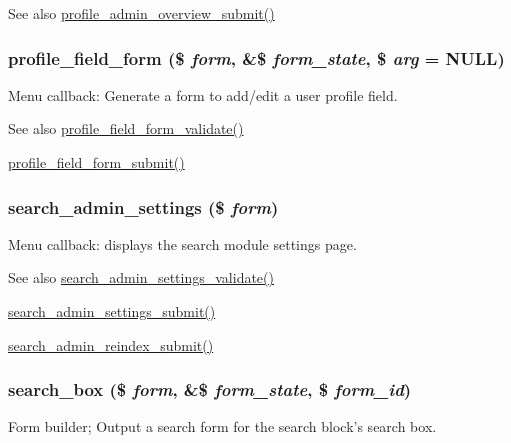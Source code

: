 \begin{DoxySeeAlso}{See also}
\hyperlink{profile_8admin_8inc_a010af3295f669ceac61a1da0f8d5ad53}{profile\_\-admin\_\-overview\_\-submit()} 
\end{DoxySeeAlso}
\hypertarget{group__forms_ga05b59d1f5368616b5bf775acbb3f87e7}{
\subsubsection[{profile\_\-field\_\-form}]{\setlength{\rightskip}{0pt plus 5cm}profile\_\-field\_\-form (\$ {\em form}, \/  \&\$ {\em form\_\-state}, \/  \$ {\em arg} = {\ttfamily NULL})}}
\label{group__forms_ga05b59d1f5368616b5bf775acbb3f87e7}
Menu callback: Generate a form to add/edit a user profile field.

\begin{DoxySeeAlso}{See also}
\hyperlink{profile_8admin_8inc_a68cc1dfe2c4f0e0946ede9786b4554e2}{profile\_\-field\_\-form\_\-validate()} 

\hyperlink{profile_8admin_8inc_a25efcaa4c4b8e9dc9568622ad0ab3411}{profile\_\-field\_\-form\_\-submit()} 
\end{DoxySeeAlso}
\hypertarget{group__forms_gaa2b01af13156640d290f3a3c6042bd3a}{
\subsubsection[{search\_\-admin\_\-settings}]{\setlength{\rightskip}{0pt plus 5cm}search\_\-admin\_\-settings (\$ {\em form})}}
\label{group__forms_gaa2b01af13156640d290f3a3c6042bd3a}
Menu callback: displays the search module settings page.

\begin{DoxySeeAlso}{See also}
\hyperlink{search_8admin_8inc_ac02dbfc93e16ceefc020a119da393584}{search\_\-admin\_\-settings\_\-validate()} 

\hyperlink{search_8admin_8inc_a805559246fe20818784c24c1f95dbaf9}{search\_\-admin\_\-settings\_\-submit()} 

\hyperlink{search_8admin_8inc_af58628d37095963f5e991d357535e957}{search\_\-admin\_\-reindex\_\-submit()} 
\end{DoxySeeAlso}
\hypertarget{group__forms_ga745b25ef751b20947460eb353f3be2af}{
\subsubsection[{search\_\-box}]{\setlength{\rightskip}{0pt plus 5cm}search\_\-box (\$ {\em form}, \/  \&\$ {\em form\_\-state}, \/  \$ {\em form\_\-id})}}
\label{group__forms_ga745b25ef751b20947460eb353f3be2af}
Form builder; Output a search form for the search block's search box.

